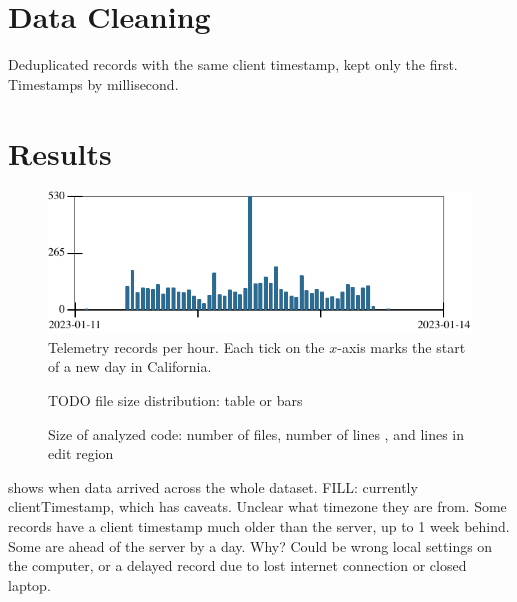 \documentclass[
  acmsmall,
  review,
  anonymous,
]{acmart}
\begin{document}
\section{Data Cleaning}

Deduplicated records with the same client timestamp,
kept only the first.
Timestamps by millisecond.




\section{Results}
\label{s:data}

\begin{figure}[t]
  \includegraphics{img/row-distribution.pdf}
  \caption{Telemetry records per hour. Each tick on the $x$-axis marks the start of a new day in California.}
  \label{f:records-per-hour}
\end{figure}

\begin{figure}[t]
  TODO file size distribution: table or bars %
  \caption{Size of analyzed code: number of files, number of lines , and lines in edit region}
  \label{f:analysis-size}
\end{figure}


 shows when data arrived across the whole dataset.
FILL: currently clientTimestamp, which has caveats.
Unclear what timezone they are from.
Some records have a client timestamp much older than the server, up to 1 week behind.
Some are ahead of the server by a day.
Why?
Could be wrong local settings on the computer, or a delayed record due to lost
internet connection or closed laptop.
\end{document}
